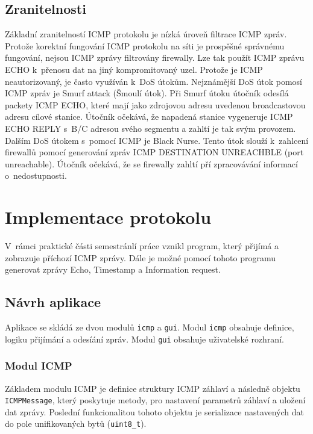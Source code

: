 \documentclass[12pt, a4paper]{article}
\begin{document}
\subsection{Zranitelnosti}

Základní zranitelností ICMP protokolu je nízká úroveň filtrace ICMP zpráv. Protože korektní fungování ICMP protokolu na síti je prospěšné správnému fungování, nejsou ICMP zprávy filtrovány firewally. Lze tak použít ICMP zprávu ECHO k~přenosu dat na jiný kompromitovaný uzel. Protože je ICMP neautorizovaný, je často využíván k~DoS útokům. 
Nejznámější DoS útok pomosí ICMP zpráv je Smurf attack (Šmoulí útok). Při Smurf útoku útočník odesílá packety ICMP ECHO, které mají jako zdrojovou adresu uvedenou broadcastovou adresu cílové stanice. Útočník očekává, že napadená stanice vygeneruje ICMP ECHO REPLY s~B/C adresou svého segmentu a zahltí je tak svým provozem.
Dalším DoS útokem s~pomocí ICMP je Black Nurse. Tento útok slouží k~zahlcení firewallů pomocí generování zpráv ICMP DESTINATION UNREACHBLE (port unreachable). Útočník očekává, že se firewally zahltí pří zpracovávání informací o~nedostupnosti.

\section{Implementace protokolu}

V~rámci praktické části semestránlí práce vznikl program, který přijímá a zobrazuje příchozí ICMP zprávy. Dále je možné pomocí tohoto programu generovat zprávy Echo, Timestamp a Information request.  

\subsection{Návrh aplikace}

Aplikace se skládá ze dvou modulů \texttt{icmp} a \texttt{gui}. Modul \texttt{icmp} obsahuje definice, logiku přijímání a odesíání zpráv. Modul \texttt{gui} obsahuje uživatelské rozhraní.

\subsubsection{Modul ICMP}

Základem modulu ICMP je definice struktury ICMP záhlaví a následně objektu \texttt{ICMPMessage}, který poskytuje metody, pro nastavení parametrů záhlaví a uložení dat zprávy. Poslední funkcionalitou tohoto objektu je serializace nastavených dat do pole unifikovaných bytů (\texttt{uint8\_t}).
\end{document}

